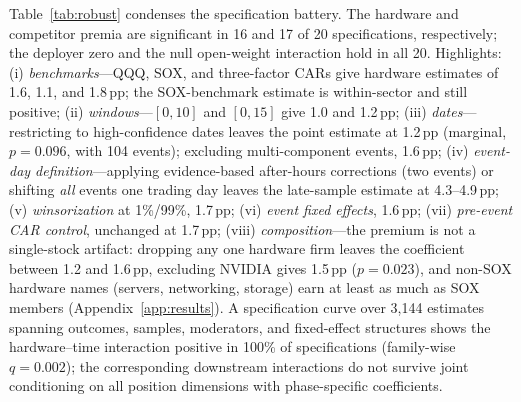 \documentclass[review,12pt,authoryear]{elsarticle}
\newcommand{\pp}{\,pp}
\begin{document}
Table~\ref{tab:robust} condenses the specification battery. The hardware and
competitor premia are significant in 16 and 17 of 20 specifications,
respectively; the deployer zero and the null open-weight interaction hold in
all 20. Highlights: (i) \emph{benchmarks}---QQQ, SOX, and three-factor CARs
give hardware estimates of 1.6, 1.1, and 1.8\pp{}; the SOX-benchmark estimate
is within-sector and still positive; (ii) \emph{windows}---$[0,10]$ and
$[0,15]$ give 1.0 and 1.2\pp{}; (iii) \emph{dates}---restricting to
high-confidence dates leaves the point estimate at 1.2\pp{} (marginal, $p=0.096$, with 104 events); excluding multi-component events, 1.6\pp{};
(iv) \emph{event-day definition}---applying evidence-based after-hours
corrections (two events) or shifting \emph{all} events one trading day leaves
the late-sample estimate at 4.3--4.9\pp{}; (v) \emph{winsorization} at
1\%/99\%, 1.7\pp{}; (vi) \emph{event fixed effects}, 1.6\pp{};
(vii) \emph{pre-event CAR control}, unchanged at 1.7\pp{};
(viii) \emph{composition}---the premium is not a single-stock artifact:
dropping any one hardware firm leaves the coefficient between 1.2 and
1.6\pp{}, excluding NVIDIA gives 1.5\pp{} ($p=0.023$), and non-SOX hardware
names (servers, networking, storage) earn at least as much as SOX members
(Appendix~\ref{app:results}). A specification
curve over 3,144 estimates spanning outcomes, samples, moderators, and
fixed-effect structures shows the hardware--time interaction positive in
100\% of specifications (family-wise $q=0.002$); the corresponding
downstream interactions do not survive joint conditioning on all position
dimensions with phase-specific coefficients.
\end{document}
